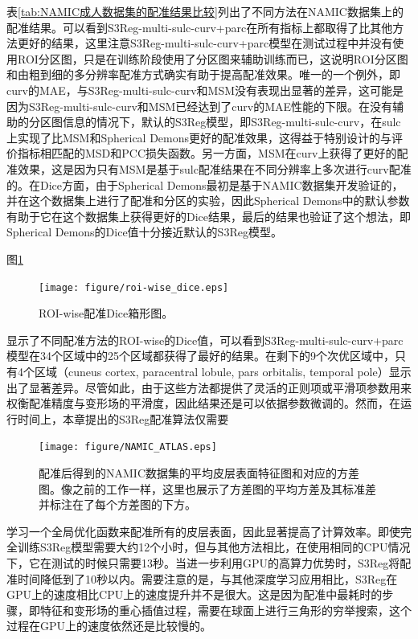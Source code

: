 表\ref{tab:NAMIC成人数据集的配准结果比较}列出了不同方法在NAMIC数据集上的配准结果。可以看到S3Reg-multi-sulc-curv+parc在所有指标上都取得了比其他方法更好的结果，这里注意S3Reg-multi-sulc-curv+parc模型在测试过程中并没有使用ROI分区图，只是在训练阶段使用了分区图来辅助训练而已，这说明ROI分区图和由粗到细的多分辨率配准方式确实有助于提高配准效果。唯一的一个例外，即curv的MAE，与S3Reg-multi-sulc-curv和MSM没有表现出显著的差异，这可能是因为S3Reg-multi-sulc-curv和MSM已经达到了curv的MAE性能的下限。在没有辅助的分区图信息的情况下，默认的S3Reg模型，即S3Reg-multi-sulc-curv，在sulc上实现了比MSM和Spherical Demons更好的配准效果，这得益于特别设计的与评价指标相匹配的MSD和PCC损失函数。另一方面，MSM在curv上获得了更好的配准效果，这是因为只有MSM是基于sulc配准结果在不同分辨率上多次进行curv配准的。在Dice方面，由于Spherical Demons最初是基于NAMIC数据集开发验证的，并在这个数据集上进行了配准和分区的实验，因此Spherical Demons中的默认参数有助于它在这个数据集上获得更好的Dice结果，最后的结果也验证了这个想法，即Spherical Demons的Dice值十分接近默认的S3Reg模型。

图\ref{fig:registration_roi_wise_dice}
\begin{figure}[t]
    \centering
    	\texttt{[image: figure/roi-wise\_dice.eps]}
	\caption{ROI-wise配准Dice箱形图。}
	\label{fig:registration_roi_wise_dice}
\end{figure}
显示了不同配准方法的ROI-wise的Dice值，可以看到S3Reg-multi-sulc-curv+parc模型在34个区域中的25个区域都获得了最好的结果。在剩下的9个次优区域中，只有4个区域（cuneus cortex, paracentral lobule, pars orbitalis, temporal pole）显示出了显著差异。尽管如此，由于这些方法都提供了灵活的正则项或平滑项参数用来权衡配准精度与变形场的平滑度，因此结果还是可以依据参数微调的。然而，在运行时间上，本章提出的S3Reg配准算法仅需要
\begin{figure}[h]
	\centering
	\texttt{[image: figure/NAMIC\_ATLAS.eps]}
	\caption{配准后得到的NAMIC数据集的平均皮层表面特征图和对应的方差图。像之前的工作\cite{lyu2019hierarchical}一样，这里也展示了方差图的平均方差及其标准差并标注在了每个方差图的下方。}
	\label{fig:NAMIC_ATLAS}
\end{figure}
学习一个全局优化函数来配准所有的皮层表面，因此显著提高了计算效率。即使完全训练S3Reg模型需要大约12个小时，但与其他方法相比，在使用相同的CPU情况下，它在测试的时候只需要13秒。当进一步利用GPU的高算力优势时，S3Reg将配准时间降低到了10秒以内。需要注意的是，与其他深度学习应用相比，S3Reg在GPU上的速度相比CPU上的速度提升并不是很大。这是因为配准中最耗时的步骤，即特征和变形场的重心插值过程，需要在球面上进行三角形的穷举搜索，这个过程在GPU上的速度依然还是比较慢的。

